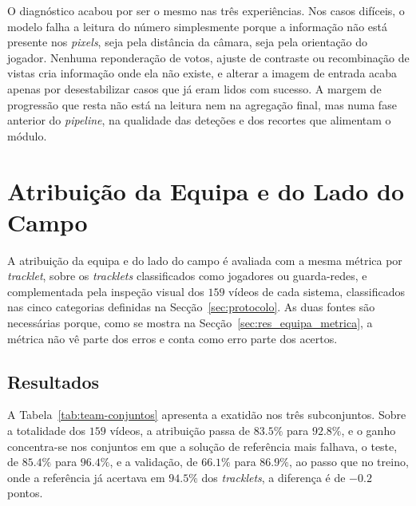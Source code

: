 O diagnóstico acabou por ser o mesmo nas três experiências. Nos casos difíceis, o modelo falha a
leitura do número simplesmente porque a informação não está presente nos \emph{pixels}, seja pela
distância da câmara, seja pela orientação do jogador. Nenhuma reponderação de votos, ajuste de
contraste ou recombinação de vistas cria informação onde ela não existe, e alterar a imagem de
entrada acaba apenas por desestabilizar casos que já eram lidos com sucesso. A margem de progressão
que resta não está na leitura nem na agregação final, mas numa fase anterior do \emph{pipeline}, na
qualidade das deteções e dos recortes que alimentam o módulo.

\section{Atribuição da Equipa e do Lado do Campo}\label{sec:res_equipa}

A atribuição da equipa e do lado do campo é avaliada com a mesma métrica por \emph{tracklet},
sobre os \emph{tracklets} classificados como jogadores ou guarda-redes, e complementada pela inspeção
visual dos $159$ vídeos de cada sistema, classificados nas cinco categorias definidas na
Secção~\ref{sec:protocolo}. As duas fontes são necessárias porque, como se mostra na
Secção~\ref{sec:res_equipa_metrica}, a métrica não vê parte dos erros e conta como erro parte dos
acertos.

\subsection{Resultados}\label{sec:res_equipa_resultados}

A Tabela~\ref{tab:team-conjuntos} apresenta a exatidão nos três subconjuntos. Sobre a totalidade
dos $159$ vídeos, a atribuição passa de $83.5\%$ para $92.8\%$, e o ganho concentra-se
nos conjuntos em que a solução de referência mais falhava, o teste, de $85.4\%$ para
$96.4\%$, e a validação, de $66.1\%$ para $86.9\%$, ao passo que no treino,
onde a referência já acertava em $94.5\%$ dos \emph{tracklets}, a diferença é de
$-0.2$ pontos.

